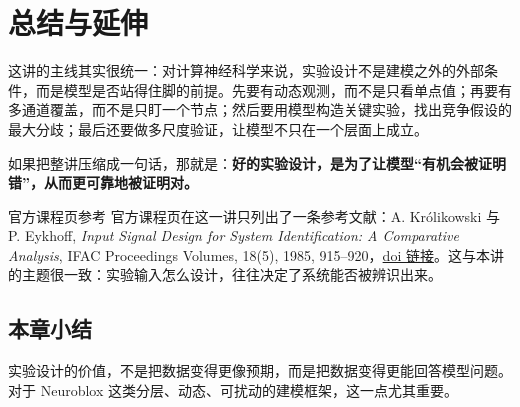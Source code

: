 \documentclass[a4paper]{article}
\begin{document}
\section{总结与延伸}
这讲的主线其实很统一：对计算神经科学来说，实验设计不是建模之外的外部条件，而是模型是否站得住脚的前提。先要有动态观测，而不是只看单点值；再要有多通道覆盖，而不是只盯一个节点；然后要用模型构造关键实验，找出竞争假设的最大分歧；最后还要做多尺度验证，让模型不只在一个层面上成立。

如果把整讲压缩成一句话，那就是：\textbf{好的实验设计，是为了让模型“有机会被证明错”，从而更可靠地被证明对。}

\begin{knowledgebox}{官方课程页参考}
官方课程页在这一讲只列出了一条参考文献：A. Królikowski 与 P. Eykhoff, \emph{Input Signal Design for System Identification: A Comparative Analysis}, IFAC Proceedings Volumes, 18(5), 1985, 915--920，\href{https://doi.org/10.1016/S1474-6670(17)60678-5}{doi 链接}。这与本讲的主题很一致：实验输入怎么设计，往往决定了系统能否被辨识出来。
\end{knowledgebox}

\subsection{本章小结}
实验设计的价值，不是把数据变得更像预期，而是把数据变得更能回答模型问题。对于 Neuroblox 这类分层、动态、可扰动的建模框架，这一点尤其重要。
\end{document}

